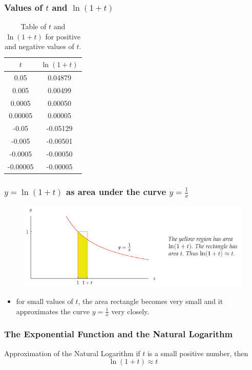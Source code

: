 \documentclass{beamer}
\begin{document}
\begin{frame}
  \frametitle{Values of \(t\) and \(\ln(1+t)\)}
  \begin{table}[]
    \centering
    \begin{tabular}{|c|c|}
      \hline
      \(t\) & \(\ln(1+t)\) \\
      \hline
      0.05 & 0.04879 \\
      0.005 & 0.00499 \\
      0.0005 & 0.00050 \\
      0.00005 & 0.00005 \\
      -0.05 & -0.05129 \\
      -0.005 & -0.00501 \\
      -0.0005 & -0.00050 \\
      -0.00005 & -0.00005 \\
      \hline
    \end{tabular}
    \caption{Table of \(t\) and \(\ln(1+t)\) for positive and negative values of \(t\).}
  \end{table}
\end{frame}

\begin{frame}
  \frametitle{ \(y = \ln(1+t)\) as area under the curve \(y = \frac{1}{x}\)}
  \begin{figure}
    \centering
    \includegraphics[scale=0.5]{e_6.png}
  \end{figure}
  \begin{itemize}
    \item for small values of \(t\), the area rectangle becomes very small and it approximates the curve \(y = \frac{1}{x}\) very closely.
  \end{itemize}
\end{frame}

\begin{frame}
  \frametitle{The Exponential Function and the Natural Logarithm}
  \begin{block}{Approximation of the Natural Logarithm}
  if \(t\) is a small positive number, then
  \[
    \ln(1+t) \approx t
  \]

  \end{block}
\end{frame}
\end{document}
